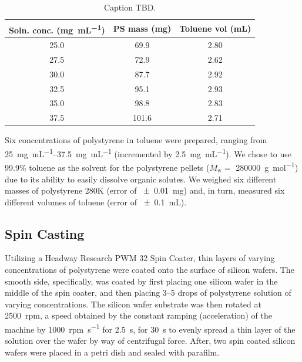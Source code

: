 \documentclass[twocolumn]{article}
\begin{document}
                \begin{table}
                    \centering
                    \begin{tabular}{@{}ccc@{}}
                        \toprule
                        Soln. conc. (\unit{\milli\gram\per\milli\liter}) & PS mass (\unit{\milli\gram}) & Toluene vol (\unit{\milli\liter}) \\ \midrule
                        25.0                           & 69.9                  & 2.80                \\
                        27.5                           & 72.9                  & 2.62                \\
                        30.0                           & 87.7                  & 2.92                \\
                        32.5                           & 95.1                  & 2.93                \\
                        35.0                           & 98.8                  & 2.83                \\
                        37.5                           & 101.6                 & 2.71                \\ \bottomrule
                    \end{tabular}
                    \caption{Caption TBD.}\label{tab:soln}
                \end{table}

                Six concentrations of polystyrene in toluene were prepared, ranging from \qtyrange{25}{37.5}{\milli\gram\per\milli\liter} (incremented by \qty{2.5}{\milli\gram\per\milli\liter}). We chose to use 99.9\% toluene as the solvent for the polystyrene pellets ($M_\text{w} = $ \qty{280000}{\gram\per\mol}) due to its ability to easily dissolve organic solutes. We weighed six different masses of polystyrene 280K (error of \qty{\pm 0.01}{\milli\gram}) and, in turn, measured six different volumes of toluene (error of \qty{\pm 0.1}{\milli\liter}).

            \subsection{Spin Casting}
                Utilizing a Headway Research PWM 32 Spin Coater, thin layers of varying concentrations of polystyrene were coated onto the surface of silicon wafers. The smooth side, specifically, was coated by first placing one silicon wafer in the middle of the spin coater, and then placing 3--5 drops of polystyrene solution of varying concentrations. The silicon wafer substrate was then rotated at \qty{2500}{rpm}, a speed obtained by the constant ramping (acceleration) of the machine by \qty{1000}{rpm\per\second} for \qty{2.5}{\second}, for \qty{30}{\second} to evenly spread a thin layer of the solution over the wafer by way of centrifugal force. After, two spin coated silicon wafers were placed in a petri dish and sealed with parafilm.
\end{document}
